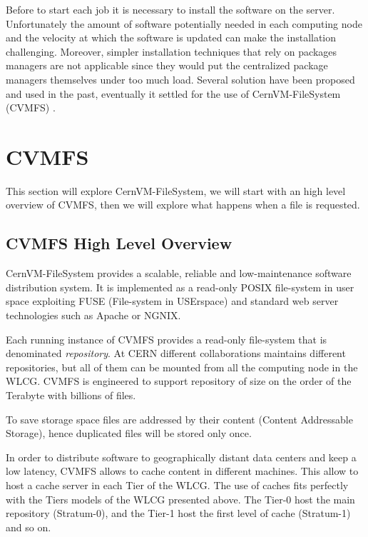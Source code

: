Before to start each job it is necessary to install the software on the server.
Unfortunately the amount of software potentially needed in each computing node
and the velocity at which the software is updated can make the installation
challenging. Moreover, simpler installation techniques that rely on packages
managers are not applicable since they would put the centralized package
managers themselves under too much load. Several solution have been proposed
and used in the past, eventually it settled for the use of CernVM-FileSystem
(CVMFS) \cite{cvmfs}.

\section{CVMFS}

This section will explore CernVM-FileSystem, we will start with an high level
overview of CVMFS, then we will explore what happens when a file is requested.


\subsection{CVMFS High Level Overview}

CernVM-FileSystem \cite{cvmfs} provides a scalable, reliable and
low-maintenance software distribution system. It is implemented as a read-only
POSIX file-system in user space exploiting FUSE (File-system in USErspace)
\cite{fuse} and standard web server technologies such as Apache or NGNIX.

Each running instance of CVMFS provides a read-only file-system that is
denominated \textit{repository}. At CERN different collaborations maintains
different repositories, but all of them can be mounted from all the computing
node in the WLCG. CVMFS is engineered to support repository of size on the
order of the Terabyte with billions of files.

To save storage space files are addressed by their content (Content Addressable
Storage), hence duplicated files will be stored only once.

In order to distribute software to geographically distant data centers and keep
a low latency, CVMFS allows to cache content in different machines. This allow
to host a cache server in each Tier of the WLCG. The use of caches fits
perfectly with the Tiers models of the WLCG presented above. The Tier-0 host
the main repository (Stratum-0), and the Tier-1 host the first level of cache
(Stratum-1) and so on.

